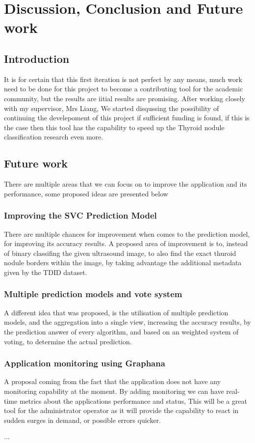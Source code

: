\chapter{Discussion, Conclusion and Future work}
\label{ch:lit_rev}
	\section{Introduction}
		It is for certain that this first iteration is not perfect by any means, much work need to be done for this project to become 
		a contributing tool for the academic community, but the results are iitial results are promising. After working closely with
		my supervisor, Mrs Liang, We started disqussing the possibility of continuing the develepoment of this project if sufficient
		funding is found, if this is the case then this tool has the capability to speed up the Thyroid nodule classification research even
		more.
	\section{Future work}
		There are multiple areas that we can focus on to improve the application and its performance, some proposed ideas are presented below
		\subsection{Improving the SVC Prediction Model}
			There are multiple chances for improvement when comes to the prediction model, for improving its accuracy results. A proposed
			area of improvement is to, instead of binary classifing the given ultrasound image, to also find the exact thuroid nodule borders
			within the image, by taking advantage the additional metadata given by the TDID dataset.
		\subsection{Multiple prediction models and vote system}
			A different idea that was proposed, is the utilisation of multiple prediction models, and the aggregation into a single view, increasing
			the accuracy results, by the prediction answer of every algorithm, and based on an weighted system of voting, to determine the actual
			prediction.
		\subsection{Application monitoring using Graphana}
			A proposal coming from the fact that the application does not have any monitoring capability at the moment. By adding monitoring
			we can have real-time metrics about the applications performance and status, This will be a great tool for the administrator operator as it
			will provide the capability to react in sudden surges in demand, or possible errors quicker.
		
		
...


